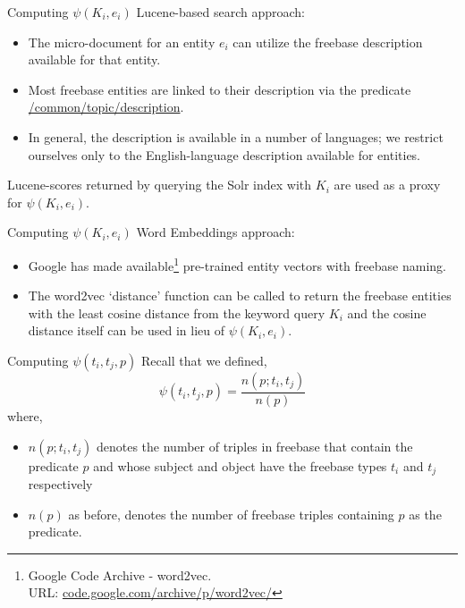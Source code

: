 \documentclass[pdf,11pt]{beamer}
\begin{document}
\begin{frame}{Computing $\psi(K_i, e_i)$}
Lucene-based search approach:

\begin{itemize}
\item The micro-document for an entity $e_i$ can utilize the freebase description available for that entity.
\item Most freebase entities are linked to their description via the predicate \url{/common/topic/description}.
\item In general, the description is available in a number of languages; we restrict ourselves only to the English-language description available for entities.
\end{itemize}

Lucene-scores returned by querying the Solr index with $K_i$ are used as a proxy for $\psi(K_i, e_i)$.
\end{frame}

\begin{frame}{Computing $\psi(K_i, e_i)$}
Word Embeddings approach:

\begin{itemize}
\item Google has made available\footnote{Google Code Archive - word2vec. \\ URL: \url{code.google.com/archive/p/word2vec/}} pre-trained entity vectors with freebase naming.
\item The word2vec `distance' function can be called to return the freebase entities with the least cosine distance from the keyword query $K_i$ and the cosine distance itself can be used in lieu of $\psi(K_i,e_i)$.
\end{itemize}
\end{frame}

\begin{frame}{Computing $\psi(t_i, t_j, p)$}
Recall that we defined, $$\psi(t_i, t_j, p) = \frac{n(p;t_i,t_j)}{n(p)}$$
where,
\begin{itemize}
\item $n(p;t_i,t_j)$ denotes the number of triples in freebase that contain the predicate $p$ and whose subject and object have the freebase types $t_i$ and $t_j$ respectively
\item $n(p)$ as before, denotes the number of freebase triples containing $p$ as the predicate.
\end{itemize}

\end{frame}
\end{document}
